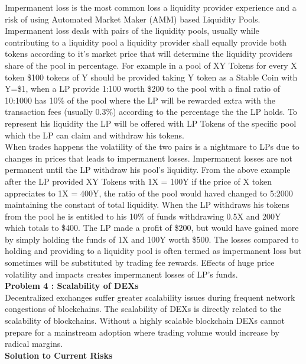 \documentclass[letterpaper,11pt]{article}
\begin{document}
Impermanent loss is the most common loss a liquidity provider experience and a risk of using Automated Market Maker (AMM) based Liquidity Pools. Impermanent loss deals with pairs of the liquidity pools, usually while contributing to a liquidity pool a liquidity provider shall equally provide both tokens according to it's market price that will determine the liquidity providers share of the pool in percentage. For example in a pool of XY Tokens for every X token \$100 tokens of Y should be provided taking Y token as a Stable Coin with Y=\$1, when a LP provide 1:100 worth \$200 to the pool with a final ratio of 10:1000 has 10\% of the pool where the LP will be rewarded extra with the transaction fees (usually 0.3\%) according to the percentage the the LP holds. To represent his liquidity the LP will be offered with LP Tokens of the specific pool which the LP can claim and withdraw his tokens.\\

When trades happens the volatility of the two pairs is a nightmare to LPs due to changes in prices that leads to impermanent losses. Impermanent losses are not permanent until the LP withdraw his pool's liquidity. From the above example after the LP provided XY Tokens with 1X = 100Y if the price of X token appreciates to 1X = 400Y, the ratio of the pool would haved changed to 5:2000 maintaining the constant of total liquidity. When the LP withdraws his tokens from the pool he is entitled to his 10\% of funds withdrawing 0.5X and 200Y which totals to \$400. The LP made a profit of \$200, but would have gained more by simply holding the funds of 1X and 100Y worth \$500. The losses compared to holding and providing to a liquidity pool is often termed as impermanent loss but sometimes will be substituted by trading fee rewards. Effects of huge price volatility and impacts creates impermanent losses of LP's funds.\\

\textbf{Problem 4 : Scalability of DEXs}\\

Decentralized exchanges suffer greater scalability issues during frequent network congestions of blockchains. The scalability of DEXs is directly related to the scalability of blockchains. Without a highly scalable blockchain DEXs cannot prepare for a mainstream adoption where trading volume would increase by radical margins.\\

\textbf{Solution to Current Risks}\\
\end{document}
